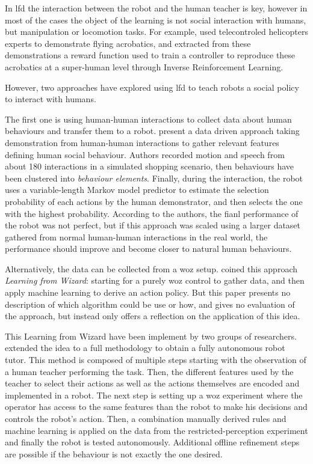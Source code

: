 	In \gls{lfd} the interaction between the robot and the human teacher is key, however in most of the cases the object of the learning is not social interaction with humans, but manipulation or locomotion tasks. For example, \cite{Abbeel2004} used telecontroled helicopters experts to demonstrate flying acrobatics, and extracted from these demonstrations a reward function used to train a controller to reproduce these acrobatics at a super-human level through Inverse Reinforcement Learning. %
	
	However, two approaches have explored using \gls{lfd} to teach robots a social policy to interact with humans.
	
	The first one is using human-human interactions to collect data about human behaviours and transfer them to a robot. \citet{liu2014train} present a data driven approach taking demonstration from human-human interactions to gather relevant features defining human social behaviour. Authors recorded motion and speech from about 180 interactions in a simulated shopping scenario, then behaviours have been clustered into \emph{behaviour elements}. Finally, during the interaction, the robot uses a variable-length Markov model predictor to estimate the selection probability of each actions by the human demonstrator, and then selects the one with the highest probability. According to the authors, the fianl performance of the robot was not perfect, but if this approach was scaled using a larger dataset gathered from normal human-human interactions in the real world, the performance should improve and become closer to natural human behaviours.
    
    Alternatively, the data can be collected from a \acrlong{woz} setup. \citep{knox2014learning} coined this approach \emph{Learning from Wizard}: starting for a purely \gls{woz} control to gather data, and then apply machine learning to derive an action policy. But this paper presents no description of which algorithm could be use or how, and gives no evaluation of the approach, but instead only offers a reflection on the application of this idea.
    
    This Learning from Wizard have been implement by two groups of researchers. \citet{sequeira2016discovering} extended the idea to a full methodology to obtain a fully autonomous robot tutor. This method is composed of multiple steps starting with the observation of a human teacher performing the task. Then, the different features used by the teacher to select their actions as well as the actions themselves are encoded and implemented in a robot. The next step is setting up a \gls{woz} experiment where the operator has access to the same features than the robot to make his decisions and controls the robot's action. Then, a combination manually derived rules and machine learning is applied on the data from the restricted-perception experiment and finally the robot is tested autonomously. Additional offline refinement steps are possible if the behaviour is not exactly the one desired. 
    
